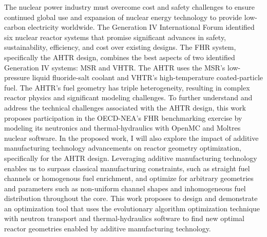 \vspace{-1.5cm}
The nuclear power industry must overcome cost and safety challenges to ensure 
continued global use and expansion of nuclear energy technology to provide 
low-carbon electricity worldwide.
The Generation IV International Forum identified six nuclear reactor systems 
that promise significant advances in safety, sustainability, efficiency, 
and cost over existing designs.
The \acrfull{FHR} system, specifically the \acrfull{AHTR} design, combines the 
best aspects of two identified Generation IV systems: \acrfull{MSR} and \acrfull{VHTR}. 
The \acrshort{AHTR} uses the \acrshort{MSR}'s low-pressure liquid fluoride-salt 
coolant and \acrshort{VHTR}'s high-temperature coated-particle fuel. 
The \acrshort{AHTR}'s fuel geometry has triple heterogeneity, resulting in complex 
reactor physics and significant modeling challenges. 
To further understand and address the technical challenges associated with the 
\acrshort{AHTR} design, this work proposes participation in the \acrlong{OECD}-\acrlong{NEA}'s 
\acrshort{FHR} benchmarking exercise by modeling its neutronics and thermal-hydraulics 
with OpenMC and Moltres nuclear software. 
In the proposed work, I will also explore the impact of additive manufacturing
technology advancements on reactor geometry optimization, specifically for the 
\acrshort{AHTR} design.
Leveraging additive manufacturing technology enables us to surpass classical manufacturing
constraints, such as straight fuel channels or homogenous fuel enrichment, and optimize for
arbitrary geometries and parameters such as non-uniform channel shapes and 
inhomogeneous fuel distribution throughout the core.
This work proposes to design and demonstrate an optimization tool that uses the 
evolutionary algorithm optimization technique with neutron transport and 
thermal-hydraulics software to find new optimal reactor geometries enabled by 
additive manufacturing technology.